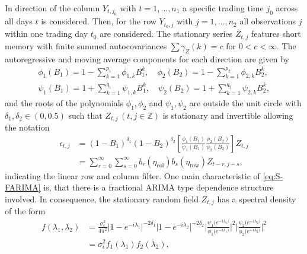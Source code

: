 \documentclass[12pt]{article}
\begin{document}
In direction of the column \( Y_{t,j_{0}}\) with \( t=1,\ldots,n_{1} \) a specific trading time \(j_{0}\) across all days \(t\) is considered. 
Then, for the row \( Y_{t_{0},j}\) with \(j=1,\ldots,n_{2} \) all observations \(j\) within one trading day \(t_0\) are considered.
The stationary series \(Z_{t,j}\) features short memory with finite summed autocovariances \(\sum \gamma_{Z}(k) = c\) for \(0 < c < \infty\).
The autoregressive and moving average components for each direction are given by
\begin{equation}
\begin{split}
	\phi_1(B_1) = 1 - \sum_{k=1}^{p_1} \phi_{1,k} B_1^k, \quad \phi_2(B_2) = 1 - \sum_{k=1}^{p_2} \phi_{2,k} B_2^k, \\
	\psi_1(B_1) = 1 + \sum_{k=1}^{q_1} \psi_{1,k} B_1^k, \quad \psi_2(B_2) = 1 + \sum_{k=1}^{q_2} \psi_{2,k} B_2^k,
	\end{split}	
\end{equation}
and the roots of the polynomials \( \phi_1,\phi_2 \) and \( \psi_1,\psi_2 \) are outside the unit circle with \(\delta_1,\delta_2 \in (0,0.5) \) such that  \(Z_{t,j} \, (t,j \in \mathbb{Z})\) is stationary and invertible allowing the notation 
\begin{equation}
\begin{split}
\epsilon_{t,j} & = (1-B_1)^{\delta_1} (1-B_2)^{\delta_2} \left[ \frac{\phi_1(B_1)}{\psi_1(B_1)}  \frac{\phi_2(B_2)}{\psi_2(B_2)} \right] Z_{t,j} \\
& = \sum_{r=0}^{\infty} \sum_{s=0}^{\infty} b_r(\eta_{\text{col}}) b_s(\eta_{\text{row}}) Z_{t-r,j-s},
\end{split}
\label{eq:error.repr}
\end{equation}
indicating the linear row and column filter.
One main characteristic of \eqref{eq:S-FARIMA} is, that there is a fractional ARIMA type dependence structure involved.
In consequence, the stationary random field \(Z_{t,j}\) has a spectral density of the form
\begin{equation}
\label{eq:2.1e}
\begin{split}
f(\lambda_1, \lambda_2) & = \frac{\sigma_{\epsilon}^{2}}{4 \pi^{2}} \big|1-e^{-i\lambda_1}\big|^{-2 \delta_1} \big|1-e^{-i\lambda_2}\big|^{-2 \delta_2} \Bigg|\frac{\psi_1 (e^{-i\lambda_1)}} {\phi_1 (e^{-i\lambda_1)}}\Bigg|^{2} \Bigg|\frac{\psi_2 (e^{-i\lambda_2)}} {\phi_2 (e^{-i\lambda_2)}}\Bigg|^{2} \\
& = \sigma_{\epsilon}^{2} f_1(\lambda_1) f_2(\lambda_2),
\end{split}
\end{equation}
\end{document}
